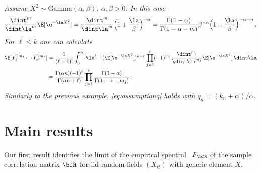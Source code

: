 \begin{example}\label{ex:gamma}{\em
 Assume $X^2\sim \text{Gamma}(\alpha,\beta)$, $\alpha,\beta>0$. In this case
\begin{equation*}
\frac{\dint^{m}}{\dint \la^{m}} \E[\e^{-\la X^2}]=\frac{\dint^{m}}{\dint \la^{m}} \Big(1+\frac{\la}{\beta}\Big)^{-\alpha} = \frac{\Gamma(1-\alpha )}{\Gamma(1-\alpha -m)} \beta^{-n} \Big(1+\frac{\la}{\beta}\Big)^{-\alpha-n}\,.
\end{equation*}
For $\ell\le k$ one can calculate
\begin{equation*}
\begin{split}
\E[ Y_{1}^{2m_1}\cdots Y_{r}^{2m_r}] 
&= \frac{1}{(\ell-1)!} \int_0^{\infty} 
\la^{\ell-1} (\E[\e^{-\la X^2}])^{n-r}  \prod_{j=1}^r (-1)^{m_j} \frac{\dint^{m_j}}{\dint \la^{m_j}} \E[\e^{-\la X^2}]  \, \dint \la\\
&= \frac{\Gamma(\alpha n)(-1)^{\ell}}{\Gamma(\alpha n +\ell)} \prod_{j=1}^r  \frac{\Gamma(1-\alpha )}{\Gamma(1-\alpha -m_j)}\,.
\end{split}
\end{equation*}
Similarly to the previous example, \eqref{eq:assumptionq} holds with $q_n=(k_n+\alpha)/\alpha$.
}\end{example}

\section{Main results}\label{sec:3}
Our first result identifies the limit of the empirical spectral \ds\ 
$F_{\bfR}$ of the sample correlation matrix $\bfR$
for iid random fields $(X_{it})$ with generic element $X$.

